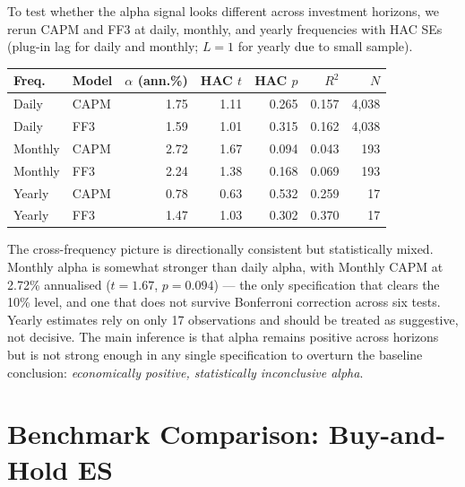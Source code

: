 \documentclass[11pt]{article}
\begin{document}
To test whether the alpha signal looks different across investment
horizons, we rerun CAPM and FF3 at daily, monthly, and yearly frequencies
with HAC SEs (plug-in lag for daily and monthly; $L = 1$ for yearly due to
small sample).

\begin{center}
\small
\begin{tabular}{l l r r r r r}
\toprule
\textbf{Freq.} & \textbf{Model} & \textbf{$\alpha$ (ann.\%)} & \textbf{HAC $t$} & \textbf{HAC $p$} & \textbf{$R^2$} & \textbf{$N$}\\
\midrule
Daily   & CAPM & 1.75 & 1.11 & 0.265 & 0.157 & 4{,}038\\
Daily   & FF3  & 1.59 & 1.01 & 0.315 & 0.162 & 4{,}038\\
Monthly & CAPM & 2.72 & 1.67 & 0.094 & 0.043 & 193\\
Monthly & FF3  & 2.24 & 1.38 & 0.168 & 0.069 & 193\\
Yearly  & CAPM & 0.78 & 0.63 & 0.532 & 0.259 & 17\\
Yearly  & FF3  & 1.47 & 1.03 & 0.302 & 0.370 & 17\\
\bottomrule
\end{tabular}
\end{center}

The cross-frequency picture is directionally consistent but statistically
mixed. Monthly alpha is somewhat stronger than daily alpha, with Monthly
CAPM at 2.72\% annualised ($t = 1.67$, $p = 0.094$) --- the only
specification that clears the 10\% level, and one that does not survive
Bonferroni correction across six tests. Yearly estimates rely on only 17
observations and should be treated as suggestive, not decisive. The main
inference is that alpha remains positive across horizons but is not
strong enough in any single specification to overturn the baseline
conclusion: \emph{economically positive, statistically inconclusive
alpha}.

\newpage

\section{Benchmark Comparison: Buy-and-Hold ES}
\label{sec:bh}
\end{document}
